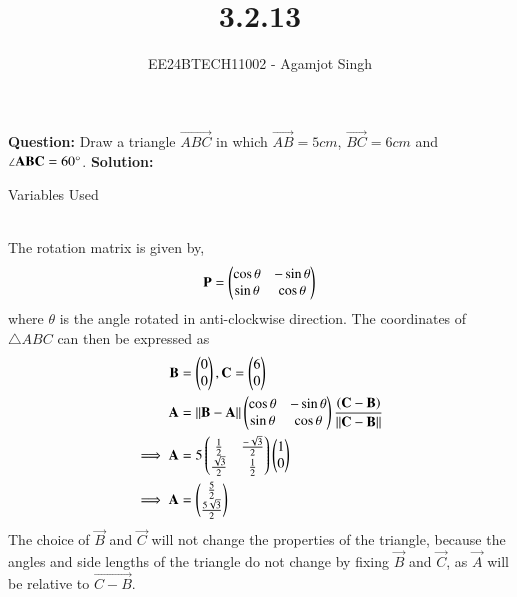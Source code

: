 \documentclass[journal]{IEEEtran}
\begin{document}

\vspace{3cm}

\title{3.2.13}
\author{EE24BTECH11002 - Agamjot Singh}
{\let\newpage\relax\maketitle}

\renewcommand{\thefigure}{\theenumi}
\renewcommand{\thetable}{\theenumi}
\setlength{\intextsep}{10pt} %

\textbf{Question:}
\newline
Draw a triangle $\vec{ABC}$ in which $\vec{AB} = 5 cm$, $\vec{BC} = 6 cm$ and $\angle\mathbf{ABC} = 60\degree$.
\newline
\textbf{Solution:}
\newline
\begin{table}[h!]    
	\centering
	
	\caption{Variables Used}
	\label{tab1-1.5-29}
\end{table}\\
The rotation matrix  is given by,
\begin{align}
	\mathbf{P} = \begin{pmatrix}\cos{\theta} & -\sin{\theta}\\\sin{\theta} & \cos{\theta}\end{pmatrix}
\end{align}
where $\theta$ is the angle rotated in anti-clockwise direction.
\newline
The coordinates of $\triangle ABC$ can then be expressed as
\begin{align}
	\mathbf{B} &= \begin{pmatrix}0\\0\end{pmatrix}, \mathbf{C} = \begin{pmatrix}6\\0\end{pmatrix}\\ 
	\mathbf{A} &= \left\lVert\mathbf{B} - \mathbf{A}\right\rVert\begin{pmatrix}\cos{\theta} & -\sin{\theta}\\\sin{\theta} & \cos{\theta}\end{pmatrix}\frac{\left(\mathbf{C} - \mathbf{B}\right)}{\left\lVert\mathbf{C} - \mathbf{B}\right\rVert}\\
	\implies \mathbf{A} &= 5\begin{pmatrix}\frac{1}{2} & \frac{-\sqrt{3}}{2}\\\frac{\sqrt{3}}{2} & \frac{1}{2}\end{pmatrix}\begin{pmatrix}1\\0\end{pmatrix}\\
	\implies \mathbf{A} &= \begin{pmatrix}\frac{5}{2}\\\frac{5\sqrt{3}}{2}\end{pmatrix}
\end{align}
The choice of $\vec{B}$ and $\vec{C}$ will not change the properties of the triangle, because the angles and side lengths of the triangle do not change by fixing $\vec{B}$ and $\vec{C}$, as $\vec{A}$ will be relative to $\vec{C - B}$.
\end{document}
